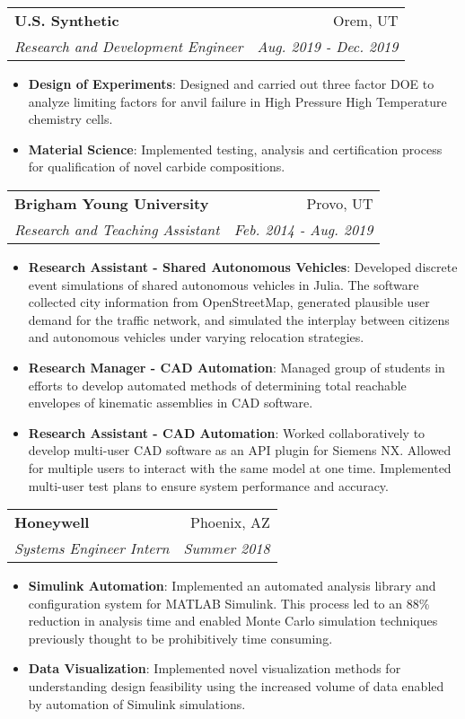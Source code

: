 \documentclass[letterpaper,11pt]{article}
\makeatletter
\newcommand{\resumeItem}[2]{
  \item\small{
    \textbf{#1}{: #2 \vspace{-3pt}}
  }
}
\newcommand{\resumeSubheading}[4]{
  \vspace{-1pt}\item
    \begin{tabular*}{0.97\textwidth}[t]{l@{\extracolsep{\fill}}r}
      \textbf{#1} & #2 \\
      \textit{\small#3} & \textit{\small #4} \\
    \end{tabular*}\vspace{-5pt}
}
\newcommand{\resumeItemListStart}{\begin{itemize}}
\newcommand{\resumeItemListEnd}{\end{itemize}\vspace{-5pt}}
\makeatother
\begin{document}
    \resumeSubheading
      {U.S. Synthetic}{Orem, UT}
      {Research and Development Engineer}{Aug. 2019 - Dec. 2019}
      \resumeItemListStart
      \resumeItem{Design of Experiments}
        {Designed and carried out three factor DOE to analyze limiting factors for anvil failure in High Pressure High Temperature chemistry cells.}
      \resumeItem{Material Science}
        {Implemented testing, analysis and certification process for qualification of novel carbide compositions.}
      \resumeItemListEnd

    \resumeSubheading
      {Brigham Young University}{Provo, UT}
      {Research and Teaching Assistant}{Feb. 2014 - Aug. 2019}
      \resumeItemListStart
        \resumeItem{Research Assistant - Shared Autonomous Vehicles}
          {Developed discrete event simulations of shared autonomous vehicles in Julia.  The software collected city information from OpenStreetMap, generated plausible user demand for the traffic network, and simulated the interplay between citizens and autonomous vehicles under varying relocation strategies.}
        \resumeItem{Research Manager - CAD Automation}
          {Managed group of students in efforts to develop automated methods of determining total reachable envelopes of kinematic assemblies in CAD software.}
        \resumeItem{Research Assistant - CAD Automation}
          {Worked collaboratively to develop multi-user CAD software as an API plugin for Siemens NX.  Allowed for multiple users to interact with the same model at one time.  Implemented multi-user test plans to ensure system performance and accuracy.}
      \resumeItemListEnd

    \resumeSubheading
      {Honeywell}{Phoenix, AZ}
      {Systems Engineer Intern}{Summer 2018}
      \resumeItemListStart
        \resumeItem{Simulink Automation}
          {Implemented an automated analysis library and configuration system for MATLAB Simulink.  This process led to an 88\% reduction in analysis time and enabled Monte Carlo simulation techniques previously thought to be prohibitively time consuming.}
        \resumeItem{Data Visualization}
          {Implemented novel visualization methods for understanding design feasibility using the increased volume of data enabled by automation of Simulink simulations.}
      \resumeItemListEnd
\end{document}

